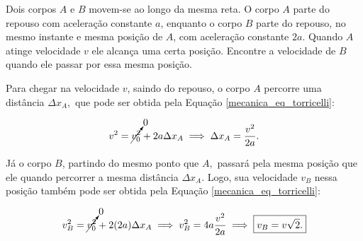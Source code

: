 \vspace{0.3cm}







\begin{exemplo}[Nível II]\label{exemplo_cinematicaescalar_torricelliex02}


Dois corpos $A$ e $B$ movem-se ao longo da mesma reta. O corpo $A$ parte do repouso com aceleração constante $a$, enquanto o corpo $B$ parte do repouso, no mesmo instante e mesma posição de $A$, com aceleração constante $2a$. Quando $A$ atinge velocidade $v$ ele alcança uma certa posição. Encontre a velocidade de $B$ quando ele passar por essa mesma posição.


\resolucao


Para chegar na velocidade $v$, saindo do repouso, o corpo $A$ percorre uma distância $\Delta x_A,$ que pode ser obtida pela Equação \eqref{mecanica_eq_torricelli}:

$$ v^2 = \cancelto{0}{v_0^2}+2a \Delta x_A \implies \Delta x_A = \dfrac{v^2}{2a}.$$

Já o corpo $B$, partindo do mesmo ponto que $A,$ passará pela mesma posição que ele quando percorrer a mesma distância $\Delta x_A. $ Logo, sua velocidade $v_B$ nessa posição também pode ser obtida pela Equação \eqref{mecanica_eq_torricelli}:

$$ v_B^2 = \cancelto{0}{v_0^2}+2(2a) \Delta x_A \implies v_B^2 = 4a \dfrac{v^2}{2a} \implies \boxed{v_B = v\sqrt{2}.}$$


\end{exemplo}

\vspace{0.3cm}











